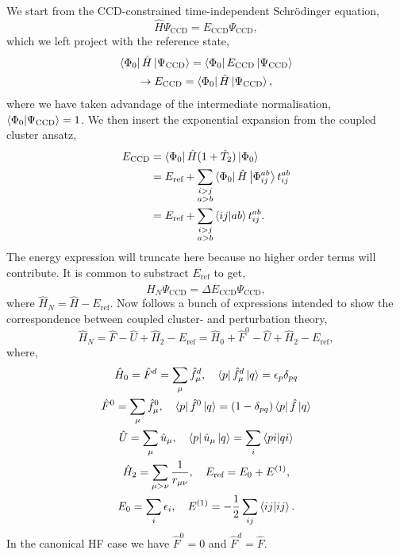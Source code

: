 We start from the CCD-constrained time-independent Schrödinger equation,
\begin{equation}
    \hat{H}\Psi_{\text{CCD}} = E_{\text{CCD}} \Psi_{\text{CCD}},
\end{equation}
which we left project with the reference state,
\begin{gather*}
    \bra{\Phi_0} \hat{H} \ket{\Psi_{\text{CCD}}} = \bra{\Phi_0} E_{\text{CCD}} \ket{\Psi_{\text{CCD}}} \nonumber \\
    \to E_{\text{CCD}} = \bra{\Phi_0} \hat{H} \ket{\Psi_{\text{CCD}}},
\end{gather*}
where we have taken advandage of the intermediate normalisation, 
$\braket{\Phi_0}{\Psi_{\text{CCD}}} = 1$. We then insert the exponential expansion
from the coupled cluster ansatz,
\begin{equation}
    \label{eq:ccd_energy}
    \begin{aligned}
    E_{\text{CCD}} &= \bra{\Phi_0} \hat{H} (1 + \hat{T}_2)\ket{\Phi_0} \\
        &= E_{\text{ref}} 
        + \sum_{\substack{i>j \\ a>b}} \bra{\Phi_0} \hat{H} \ket{\Phi_{ij}^{ab}}t^{ab}_{ij} \\
        &= E_{\text{ref}}
        + \sum_{\substack{i>j \\ a>b}} \bra{ij}  \ket{ab}t^{ab}_{ij}.
    \end{aligned}
\end{equation}
The energy expression will truncate here because no higher order terms will contribute.
It is common to substract $E_{\text{ref}}$ to get,
\begin{equation}
    \hat{H}_N \Psi_{\text{CCD}} = \Delta E_{\text{CCD}} \Psi_{\text{CCD}},
\end{equation}
where $\hat{H}_N = \hat{H} - E_{\text{ref}}$. Now follows a bunch of expressions
intended to show the correspondence between coupled cluster- and perturbation theory,
\begin{equation}
    \hat{H}_N = \hat{F} - \hat{U} + \hat{H}_2 - E_{\text{ref}}
        = \hat{H}_0 + \hat{F}^0 - \hat{U} + \hat{H}_2 - E_{\text{ref}},
\end{equation}
where,
\begin{gather}
    \hat{H}_0 = \hat{F}^d = \sum_\mu \hat{f}_\mu^d, 
        \quad \bra{p} \hat{f}_\mu^d \ket{q} = \epsilon_p \delta_{pq} \\
    \hat{F}^0 = \sum_\mu \hat{f}^0_\mu,
        \quad \bra{p} \hat{f}^0 \ket{q} = (1 - \delta_{pq})\bra{p} \hat{f} \ket{q} \\
    \hat{U} = \sum_\mu \hat{u}_\mu, 
        \quad \bra{p} \hat{u}_\mu \ket{q} = \sum_i \bra{pi} \ket{qi} \\
    \hat{H}_2 = \sum_{\mu > \nu} \frac{1}{r_{\mu\nu}},
        \quad E_{\text{ref}} = E_0 + E^{(1)}, \\
    E_0  = \sum_i \epsilon_i, \quad E^{(1)} = - \frac{1}{2} \sum_{ij} \bra{ij} \ket{ij}.
\end{gather}
In the canonical HF case we have $\hat{F}^0 = 0$ and $\hat{F}^d = \hat{F}$.

